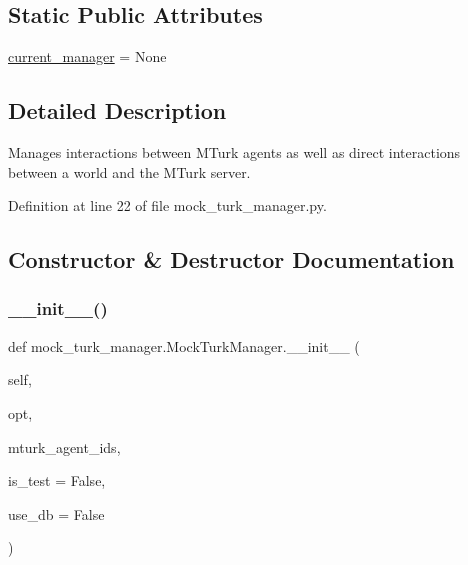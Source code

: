 \subsection*{Static Public Attributes}
\begin{DoxyCompactItemize}
\item 
\hyperlink{classmock__turk__manager_1_1MockTurkManager_aac57eebbadfaf965b4ad9305a20f88b8}{current\+\_\+manager} = None
\end{DoxyCompactItemize}


\subsection{Detailed Description}
\begin{DoxyVerb}Manages interactions between MTurk agents as well as direct interactions
between a world and the MTurk server.
\end{DoxyVerb}
 

Definition at line 22 of file mock\+\_\+turk\+\_\+manager.\+py.



\subsection{Constructor \& Destructor Documentation}
\mbox{\label{classmock__turk__manager_1_1MockTurkManager_a8f6158c2e7ad659f0d4a1f54865dd766}} 
\subsubsection{\texorpdfstring{\+\_\+\+\_\+init\+\_\+\+\_\+()}{\_\_init\_\_()}}
{\footnotesize\ttfamily def mock\+\_\+turk\+\_\+manager.\+Mock\+Turk\+Manager.\+\_\+\+\_\+init\+\_\+\+\_\+ (\begin{DoxyParamCaption}\item[{}]{self,  }\item[{}]{opt,  }\item[{}]{mturk\+\_\+agent\+\_\+ids,  }\item[{}]{is\+\_\+test = {\ttfamily False},  }\item[{}]{use\+\_\+db = {\ttfamily False} }\end{DoxyParamCaption})}

